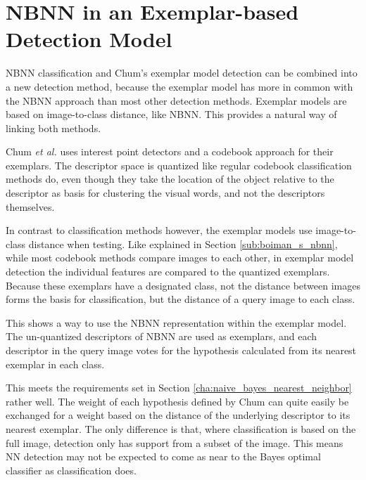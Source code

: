 
\section{NBNN in an Exemplar-based Detection Model} %
\label{cha:linking}

NBNN classification and Chum's exemplar model detection can be combined into a new detection method, because the exemplar model has more in common with the NBNN approach than most other detection methods. Exemplar models are based on image-to-class distance, like NBNN. This provides a natural way of linking both methods.

Chum \emph{et al.}\cite{chum2007exemplar} uses interest point detectors and a codebook approach for their exemplars. The descriptor space is quantized like regular codebook classification methods do, even though they take the location of the object relative to the descriptor as basis for clustering the visual words, and not the descriptors themselves.

In contrast to classification methods however, the exemplar models use image-to-class distance when testing. Like explained in Section \ref{sub:boiman_s_nbnn}, while most codebook methods  compare images to each other, in exemplar model detection the individual features are compared to the quantized exemplars. Because these exemplars have a designated class, not the distance between images forms the basis for classification, but the distance of a query image to each class.

This shows a way to use the NBNN representation within the exemplar model. The un-quantized descriptors of NBNN are used as exemplars, and each descriptor in the query image votes for the hypothesis calculated from its nearest exemplar in each class. 

This meets the requirements set in Section \ref{cha:naive_bayes_nearest_neighbor} rather well. The weight of each hypothesis defined by Chum can quite easily be exchanged for a weight based on the distance of the underlying descriptor to its nearest exemplar. The only difference is that, where classification is based on the full image, detection only has support from a subset of the image. This means NN detection may not be expected to come as near to the Bayes optimal classifier as classification does.

